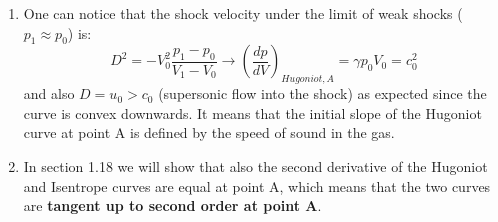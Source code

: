 ﻿\documentclass[11pt]{article}
\begin{document}
\begin{enumerate}
\begin{equation}
  \end{equation}
  which is exactly the slope of the isentrope curve at point A ($PV^\gamma \sim const \Rightarrow \left(\frac{\partial p}{\partial V}\right)_S = -\frac{\gamma p}{V}wg7$)
  \item One can notice that the shock velocity under the limit of weak shocks ($p_1 \approx p_0$) is:
  \begin{equation}
    D^2 = -V_0^2 \frac{p_1-p_0}{V_1 - V_0} \to \left( \frac{dp}{dV} \right)_{Hugoniot, A} = \gamma p_0 V_0 = c_0^2
  \end{equation}
  and also $D=u_0 > c_0$ (supersonic flow into the shock) as expected since the curve is convex downwards. It means that the initial slope of the Hugoniot curve at point A is defined by the speed of sound in the gas.
  \item In section 1.18 we will show that also the second derivative of the Hugoniot and Isentrope curves are equal at point A, which means that the two curves are \textbf{tangent up to second order at point A}.
  \end{enumerate}
\end{document}
